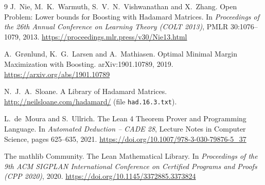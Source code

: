 \documentclass[11pt]{article}
\theoremstyle{remark}
\begin{document}
\begin{thebibliography}{9}
J.~Nie, M.~K.~Warmuth, S.~V.~N.~Vishwanathan and X.~Zhang.
Open Problem: Lower bounds for Boosting with Hadamard Matrices.
In \emph{Proceedings of the 26th Annual Conference on Learning Theory (COLT 2013)},
PMLR 30:1076--1079, 2013.
\url{https://proceedings.mlr.press/v30/Nie13.html}

A.~Gr{\o}nlund, K.~G.~Larsen and A.~Mathiasen.
Optimal Minimal Margin Maximization with Boosting.
arXiv:1901.10789, 2019. \url{https://arxiv.org/abs/1901.10789}

N.~J.~A.~Sloane. A Library of Hadamard Matrices.
\url{http://neilsloane.com/hadamard/} (file \texttt{had.16.3.txt}).

L.~de~Moura and S.~Ullrich.
The Lean 4 Theorem Prover and Programming Language.
In \emph{Automated Deduction -- CADE 28}, Lecture Notes in Computer Science, pages 625--635, 2021.
\url{https://doi.org/10.1007/978-3-030-79876-5_37}

The mathlib Community.
The Lean Mathematical Library.
In \emph{Proceedings of the 9th ACM SIGPLAN International Conference on Certified Programs
and Proofs (CPP 2020)}, 2020.
\url{https://doi.org/10.1145/3372885.3373824}
\end{thebibliography}
\end{document}
